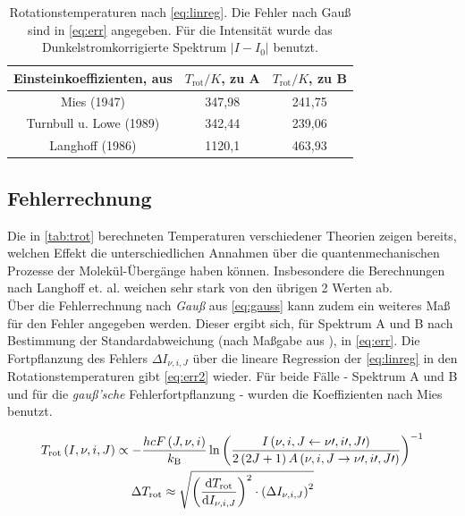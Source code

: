 \documentclass[numbers=noenddot,a4paper,notitlepage,twoside,BCOR15mm]{scrartcl}
\newcommand{\diff}{\textnormal{d}}
\newcommand{\ix}[1]{_\text{#1}}
\newcommand{\tilt}[1]{\textit{#1}}
\begin{document}
				\begin{table}[h]
					\centering
					\begin{tabular}{c|c|c}
						Einsteinkoeffizienten, aus \cite{EMAUGreifswaldOHRot} & $T\ix{rot}/\unit{K}$, zu A & $T\ix{rot}/\unit{K}$, zu B\\
						\hline Mies (1947) & 347,98 & 241,75 \\
						\hline Turnbull u. Lowe (1989) & 342,44 & 239,06 \\
						\hline Langhoff (1986) & 1120,1 & 463,93
					\end{tabular}
					\caption{Rotationstemperaturen nach \autoref{eq:linreg}. Die Fehler nach Gauß sind in \autoref{eq:err} angegeben. Für die Intensität wurde das Dunkelstromkorrigierte Spektrum $|I-I\ix{0}|$ benutzt.}
					\label{tab:trot}
				\end{table}

		\subsection{Fehlerrechnung}


			Die in \autoref{tab:trot} berechneten Temperaturen verschiedener Theorien zeigen bereits, welchen Effekt die unterschiedlichen Annahmen über die quantenmechanischen Prozesse der Molekül-Übergänge haben können. Insbesondere die Berechnungen nach Langhoff et. al. weichen sehr stark von den übrigen 2 Werten ab.\\
			Über die Fehlerrechnung nach \tilt{Gauß} aus \autoref{eq:gauss} kann zudem ein weiteres Maß für den Fehler angegeben werden. Dieser ergibt sich, für Spektrum A und B nach Bestimmung der Standardabweichung (nach Maßgabe aus \cite{EMAUGreifswaldOHRotat}), in \autoref{eq:err}. Die Fortpflanzung des Fehlers $\Delta I_{\nu,i,J}$ über die lineare Regression der \autoref{eq:linreg} in den Rotationstemperaturen gibt \autoref{eq:err2} wieder. Für beide Fälle - Spektrum A und B und für die \tilt{gauß'sche} Fehlerfortpflanzung - wurden die Koeffizienten nach Mies benutzt.

				\begin{align}
					T\ix{rot}\left(I,\nu,i,J\right)\propto-&\frac{hcF\left(J,\nu,i\right)}{k\ix{B}}\ln\left(\frac{I\left(\nu,i,J\leftarrow\nu\prime,i\prime,J\prime\right)}{2\left(2J+1\right)A\left(\nu,i,J\rightarrow\nu\prime,i\prime,J\prime\right)}\right)^{-1} \\
					\Delta& T\ix{rot}\approx\sqrt{\left(\frac{\diff T\ix{rot}}{\diff I_{\nu,i,J}}\right)^2\cdot\left(\Delta I_{\nu,i,J}\right)^2} \label{eq:gauss}
				\end{align}
\end{document}
